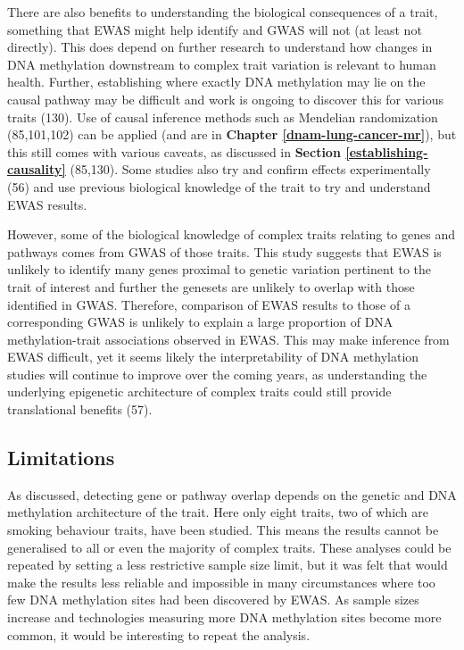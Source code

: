 \documentclass[11pt,twoside]{bristolthesis}
\begin{document}
There are also benefits to understanding the biological consequences of a trait, something that EWAS might help identify and GWAS will not (at least not directly). This does depend on further research to understand how changes in DNA methylation downstream to complex trait variation is relevant to human health. Further, establishing where exactly DNA methylation may lie on the causal pathway may be difficult and work is ongoing to discover this for various traits (130). Use of causal inference methods such as Mendelian randomization (85,101,102) can be applied (and are in \textbf{Chapter \ref{dnam-lung-cancer-mr}}), but this still comes with various caveats, as discussed in \textbf{Section \ref{establishing-causality}} (85,130). Some studies also try and confirm effects experimentally (56) and use previous biological knowledge of the trait to try and understand EWAS results.

However, some of the biological knowledge of complex traits relating to genes and pathways comes from GWAS of those traits. This study suggests that EWAS is unlikely to identify many genes proximal to genetic variation pertinent to the trait of interest and further the genesets are unlikely to overlap with those identified in GWAS. Therefore, comparison of EWAS results to those of a corresponding GWAS is unlikely to explain a large proportion of DNA methylation-trait associations observed in EWAS. This may make inference from EWAS difficult, yet it seems likely the interpretability of DNA methylation studies will continue to improve over the coming years, as understanding the underlying epigenetic architecture of complex traits could still provide translational benefits (57).

\hypertarget{limitations-06}{%
\subsection{Limitations}\label{limitations-06}}

As discussed, detecting gene or pathway overlap depends on the genetic and DNA methylation architecture of the trait. Here only eight traits, two of which are smoking behaviour traits, have been studied. This means the results cannot be generalised to all or even the majority of complex traits. These analyses could be repeated by setting a less restrictive sample size limit, but it was felt that would make the results less reliable and impossible in many circumstances where too few DNA methylation sites had been discovered by EWAS. As sample sizes increase and technologies measuring more DNA methylation sites become more common, it would be interesting to repeat the analysis.
\end{document}
